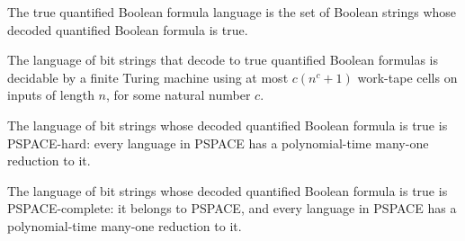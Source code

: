\begin{definition}
\label{Complexity.TQBF}
\leanok
{}
The true quantified Boolean formula language is the set of Boolean strings whose decoded
quantified Boolean formula is true.
\end{definition}

\begin{theorem}
\label{Complexity.TQBF_mem_PSPACE}
\leanok
{}
The language of bit strings that decode to true quantified Boolean formulas is decidable
by a finite Turing machine using at most $c(n^c+1)$ work-tape cells on inputs of length
$n$, for some natural number $c$.
\end{theorem}

\begin{theorem}
\label{Complexity.TQBF_PSPACEHard}
\leanok
{}
The language of bit strings whose decoded quantified Boolean formula is true is
PSPACE-hard: every language in PSPACE has a polynomial-time many-one reduction to it.
\end{theorem}

\begin{theorem}
\label{Complexity.TQBF_PSPACEComplete}
\leanok
{}
The language of bit strings whose decoded quantified Boolean formula is true is
PSPACE-complete: it belongs to PSPACE, and every language in PSPACE has a
polynomial-time many-one reduction to it.
\end{theorem}
